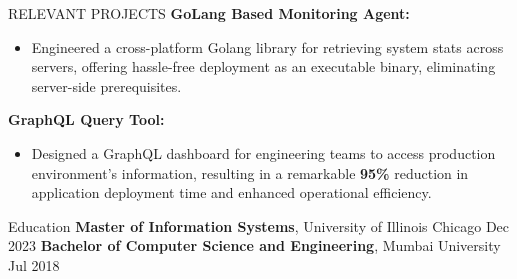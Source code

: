 \documentclass{resume} %
\begin{document}
\vspace{-2mm}
\begin{rSection}{RELEVANT PROJECTS}
\vspace{-1mm}
\textbf{GoLang Based Monitoring Agent: }
\vspace{-3mm}
 \begin{itemize}
    \itemsep -8pt {} 
    \item Engineered a cross-platform Golang library for retrieving system stats across servers, offering hassle-free deployment as an executable binary, eliminating server-side prerequisites.
 \end{itemize}
 
\vspace{-2mm}
\textbf{GraphQL Query Tool:}
\vspace{-3mm}
 \begin{itemize}
    \itemsep -8pt {}
    \item Designed a GraphQL dashboard for engineering teams to access production environment's information, resulting in a remarkable \textbf{95\%} reduction in application deployment time and enhanced operational efficiency.
 \end{itemize}
 

 \end{rSection} 

\vspace{-2mm}


\begin{rSection}{Education}
{\bf Master of Information Systems}, University of Illinois Chicago \hfill {Dec 2023}  \newline 
{\bf Bachelor of Computer Science and Engineering}, Mumbai University \hfill {Jul 2018} 


\end{rSection}

\vspace{-2mm}
\end{document}
